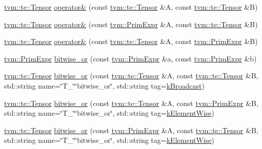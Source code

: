 \begin{DoxyCompactItemize}
\item 
\hyperlink{classtvm_1_1te_1_1Tensor}{tvm\+::te\+::\+Tensor} \hyperlink{namespacetopi_ab4549df75d9370cb59242a929d263a40}{operator\&} (const \hyperlink{classtvm_1_1te_1_1Tensor}{tvm\+::te\+::\+Tensor} \&A, const \hyperlink{classtvm_1_1te_1_1Tensor}{tvm\+::te\+::\+Tensor} \&B)
\item 
\hyperlink{classtvm_1_1te_1_1Tensor}{tvm\+::te\+::\+Tensor} \hyperlink{namespacetopi_afa1f2ad2e107aec4303ea8d67e4106cf}{operator\&} (const \hyperlink{classtvm_1_1PrimExpr}{tvm\+::\+Prim\+Expr} \&A, const \hyperlink{classtvm_1_1te_1_1Tensor}{tvm\+::te\+::\+Tensor} \&B)
\item 
\hyperlink{classtvm_1_1te_1_1Tensor}{tvm\+::te\+::\+Tensor} \hyperlink{namespacetopi_a6b148b2746c34daba96f3cd914f50061}{operator\&} (const \hyperlink{classtvm_1_1te_1_1Tensor}{tvm\+::te\+::\+Tensor} \&A, const \hyperlink{classtvm_1_1PrimExpr}{tvm\+::\+Prim\+Expr} \&B)
\item 
\hyperlink{classtvm_1_1PrimExpr}{tvm\+::\+Prim\+Expr} \hyperlink{namespacetopi_a8739fc442527f4063babae06a9b98c82}{bitwise\+\_\+or} (const \hyperlink{classtvm_1_1PrimExpr}{tvm\+::\+Prim\+Expr} \&a, const \hyperlink{classtvm_1_1PrimExpr}{tvm\+::\+Prim\+Expr} \&b)
\item 
\hyperlink{classtvm_1_1te_1_1Tensor}{tvm\+::te\+::\+Tensor} \hyperlink{namespacetopi_a942d7876a21c5fd9afaaf4f12b48490f}{bitwise\+\_\+or} (const \hyperlink{classtvm_1_1te_1_1Tensor}{tvm\+::te\+::\+Tensor} \&A, const \hyperlink{classtvm_1_1te_1_1Tensor}{tvm\+::te\+::\+Tensor} \&B, std\+::string name=\char`\"{}T\+\_\+\char`\"{}\char`\"{}bitwise\+\_\+or\char`\"{}, std\+::string tag=\hyperlink{namespacetopi_a794b9155e9ba9d1c9c42a1cff1fb645f}{k\+Broadcast})
\item 
\hyperlink{classtvm_1_1te_1_1Tensor}{tvm\+::te\+::\+Tensor} \hyperlink{namespacetopi_a5866fbecfd3d0e818b51675164d75589}{bitwise\+\_\+or} (const \hyperlink{classtvm_1_1te_1_1Tensor}{tvm\+::te\+::\+Tensor} \&A, const \hyperlink{classtvm_1_1PrimExpr}{tvm\+::\+Prim\+Expr} \&B, std\+::string name=\char`\"{}T\+\_\+\char`\"{}\char`\"{}bitwise\+\_\+or\char`\"{}, std\+::string tag=\hyperlink{namespacetopi_ac1b34ed59d38a5f5338bee6b2cad42be}{k\+Element\+Wise})
\item 
\hyperlink{classtvm_1_1te_1_1Tensor}{tvm\+::te\+::\+Tensor} \hyperlink{namespacetopi_a1cd6cd15c8db13b9a8bd5da9b2c543a2}{bitwise\+\_\+or} (const \hyperlink{classtvm_1_1PrimExpr}{tvm\+::\+Prim\+Expr} \&A, const \hyperlink{classtvm_1_1te_1_1Tensor}{tvm\+::te\+::\+Tensor} \&B, std\+::string name=\char`\"{}T\+\_\+\char`\"{}\char`\"{}bitwise\+\_\+or\char`\"{}, std\+::string tag=\hyperlink{namespacetopi_ac1b34ed59d38a5f5338bee6b2cad42be}{k\+Element\+Wise})

\end{DoxyCompactItemize}
